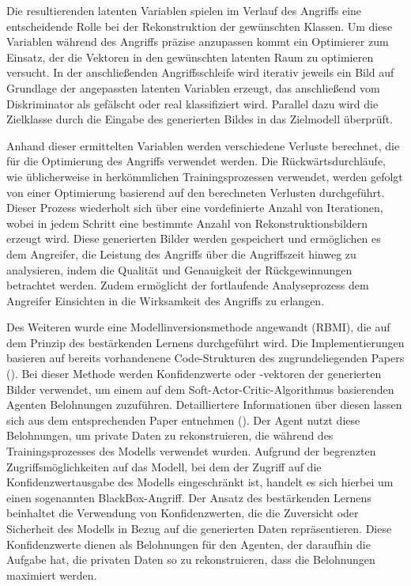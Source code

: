 Die resultierenden latenten Variablen spielen im Verlauf des Angriffs eine entscheidende Rolle bei der Rekonstruktion der gewünschten Klassen. Um diese Variablen während des Angriffs präzise anzupassen kommt ein Optimierer zum Einsatz, der die Vektoren in den gewünschten latenten Raum zu optimieren versucht. In der anschließenden Angriffsschleife wird iterativ jeweils ein Bild auf Grundlage der angepassten latenten Variablen erzeugt, das anschließend vom Diskriminator als gefälscht oder real klassifiziert wird. Parallel dazu wird die Zielklasse durch die Eingabe des generierten Bildes in das Zielmodell überprüft.

Anhand dieser ermittelten Variablen werden verschiedene Verluste berechnet, die für die Optimierung des Angriffs verwendet werden. Die Rückwärtsdurchläufe, wie üblicherweise in herkömmlichen Trainingsprozessen verwendet, werden gefolgt von einer Optimierung basierend auf den berechneten Verlusten durchgeführt. Dieser Prozess wiederholt sich über eine vordefinierte Anzahl von Iterationen, wobei in jedem Schritt eine bestimmte Anzahl von Rekonstruktionsbildern erzeugt wird. Diese generierten Bilder werden gespeichert und ermöglichen es dem Angreifer, die Leistung des Angriffs über die Angriffszeit hinweg zu analysieren, indem die Qualität und Genauigkeit der Rückgewinnungen betrachtet werden. Zudem ermöglicht der fortlaufende Analyseprozess dem Angreifer Einsichten in die Wirksamkeit des Angriffs zu erlangen.

Des Weiteren wurde eine Modellinversionsmethode angewandt (\glqq RBMI\grqq{}), die auf dem Prinzip des bestärkenden Lernens durchgeführt wird. Die Implementierungen basieren auf bereits vorhandenene Code-Strukturen des zugrundeliegenden Papers (\cite{han_reinforcement_2023}). Bei dieser Methode werden Konfidenzwerte oder -vektoren der generierten Bilder verwendet, um einem  auf dem \glqq Soft-Actor-Critic-Algorithmus\grqq{} basierenden Agenten Belohnungen zuzuführen. Detailliertere Informationen über diesen lassen sich aus dem entsprechenden Paper entnehmen (\cite{haarnoja_soft_2019}). Der Agent nutzt diese Belohnungen, um private Daten zu rekonstruieren, die während des Trainingsprozesses des Modells verwendet wurden. Aufgrund der begrenzten Zugriffsmöglichkeiten auf das Modell, bei dem der Zugriff auf die Konfidenzwertausgabe des Modells eingeschränkt ist, handelt es sich hierbei um einen sogenannten BlackBox-Angriff.
Der Ansatz des bestärkenden Lernens beinhaltet die Verwendung von Konfidenzwerten, die die Zuversicht oder Sicherheit des Modells in Bezug auf die generierten Daten repräsentieren. Diese Konfidenzwerte dienen als Belohnungen für den Agenten, der daraufhin die Aufgabe hat, die privaten Daten so zu rekonstruieren, dass die Belohnungen maximiert werden.

